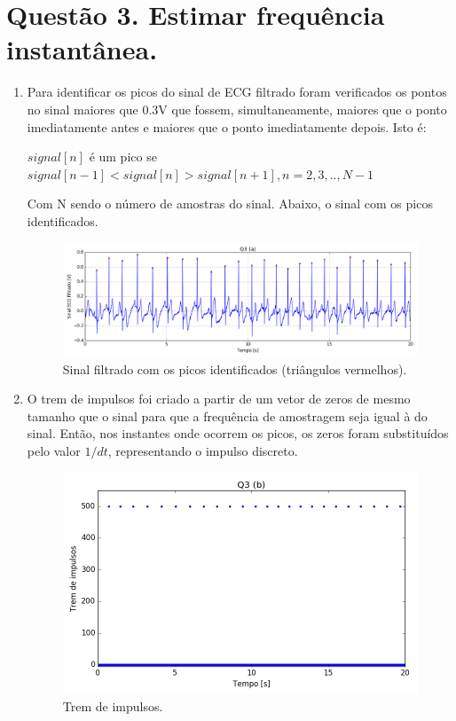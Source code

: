 \documentclass[12pt,letterpaper]{article}
\begin{document}
\section*{Questão 3. Estimar frequência instantânea.}
\begin{enumerate}[label=(\alph*)]  %
    \item Para identificar os picos do sinal de ECG filtrado foram verificados os pontos no sinal maiores que 0.3V que fossem, simultaneamente, maiores que o ponto imediatamente antes e maiores que o ponto imediatamente depois. Isto é:
    
    $signal[n]$ é um pico se $signal[n-1] < signal[n] > signal[n+1] , n = 2,3,..,N-1$
    
    Com N sendo o número de amostras do sinal. Abaixo, o sinal com os picos identificados.
    
        \begin{figure}[H]
            \centering
            \includegraphics[width=15cm]{TC1/images/Q3a.png}
            \caption{Sinal filtrado com os picos identificados (triângulos vermelhos).}
            \label{fig:19}
        \end{figure}
    
    \item O trem de impulsos foi criado a partir de um vetor de zeros de mesmo tamanho que o sinal para que a frequência de amostragem seja igual à do sinal. Então, nos instantes onde ocorrem os picos, os zeros foram substituídos pelo valor $1/{dt}$, representando o impulso discreto.
    
        \begin{figure}[H]
            \centering
            \includegraphics[width=.9\textwidth]{TC1/images/Q3b.png}
            \caption{Trem de impulsos.}
            \label{fig:20}
        \end{figure}
        

\end{enumerate}
\end{document}
